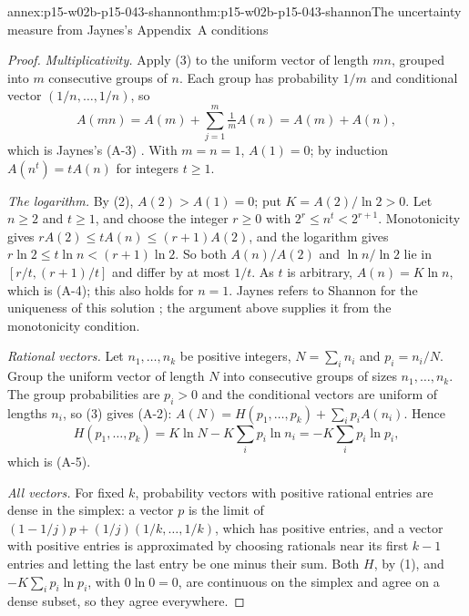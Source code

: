 \begin{annexitem}{annex:p15-w02b-p15-043-shannon}{thm:p15-w02b-p15-043-shannon}{The uncertainty measure from Jaynes's Appendix~A conditions}
\begin{proof}
\emph{Multiplicativity.} Apply (3) to the uniform vector of length \(mn\),
grouped into \(m\) consecutive groups of \(n\). Each group has probability
\(1/m\) and conditional vector \((1/n,\ldots,1/n)\), so
\[
 A(mn)=A(m)+\sum_{j=1}^m\tfrac1mA(n)=A(m)+A(n),
\]
which is Jaynes's (A-3) \cite[p.~630]{Jaynes1957InformationTheory}. With
\(m=n=1\), \(A(1)=0\); by induction \(A(n^t)=tA(n)\) for integers
\(t\geq1\).

\emph{The logarithm.} By (2), \(A(2)>A(1)=0\); put \(K=A(2)/\ln2>0\). Let
\(n\geq2\) and \(t\geq1\), and choose the integer \(r\geq0\) with
\(2^r\leq n^t<2^{r+1}\). Monotonicity gives
\(rA(2)\leq tA(n)\leq(r+1)A(2)\), and the logarithm gives
\(r\ln2\leq t\ln n<(r+1)\ln2\). So both \(A(n)/A(2)\) and \(\ln n/\ln2\) lie in
\([r/t,(r+1)/t]\) and differ by at most \(1/t\). As \(t\) is arbitrary,
\(A(n)=K\ln n\), which is (A-4); this also holds for \(n=1\). Jaynes refers to
Shannon for the uniqueness of this solution
\cite[p.~630]{Jaynes1957InformationTheory}; the argument above supplies it from
the monotonicity condition.

\emph{Rational vectors.} Let \(n_1,\ldots,n_k\) be positive integers,
\(N=\sum_in_i\) and \(p_i=n_i/N\). Group the uniform vector of length \(N\)
into consecutive groups of sizes \(n_1,\ldots,n_k\). The group probabilities are
\(p_i>0\) and the conditional vectors are uniform of lengths \(n_i\), so (3)
gives (A-2): \(A(N)=H(p_1,\ldots,p_k)+\sum_ip_iA(n_i)\). Hence
\[
 H(p_1,\ldots,p_k)=K\ln N-K\sum_ip_i\ln n_i=-K\sum_ip_i\ln p_i ,
\]
which is (A-5).

\emph{All vectors.} For fixed \(k\), probability vectors with positive rational
entries are dense in the simplex: a vector \(p\) is the limit of
\((1-1/j)p+(1/j)(1/k,\ldots,1/k)\), which has positive entries, and a vector with
positive entries is approximated by choosing rationals near its first \(k-1\)
entries and letting the last entry be one minus their sum. Both \(H\), by (1), and
\(-K\sum_ip_i\ln p_i\), with \(0\ln0=0\), are continuous on the simplex and agree
on a dense subset, so they agree everywhere.
\end{proof}
\end{annexitem}

